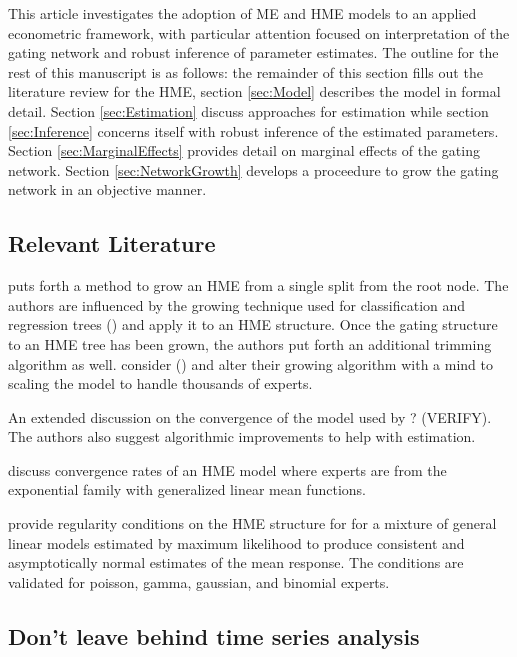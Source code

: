 \documentclass[12pt]{article}
\begin{document}
\bigskip

This article investigates the adoption of ME and HME models to an applied
econometric framework, with particular attention focused on interpretation of
the gating network and robust inference of parameter estimates. The outline for the
rest of this manuscript is as follows: the remainder of this section
fills out the literature review for the HME, section \ref{sec:Model} describes
the model in formal detail. Section \ref{sec:Estimation} discuss approaches
for estimation while section \ref{sec:Inference} concerns itself with robust
inference of the estimated parameters. Section \ref{sec:MarginalEffects}
provides detail on marginal effects of the gating network. Section
\ref{sec:NetworkGrowth} develops a proceedure to grow the gating network
in an objective manner. 


\subsection{Relevant Literature}

\cite{WaterhouseRobinson1995} puts forth a method to grow an HME from a 
single split from the root node. The authors are influenced by the growing
technique used for classification and regression trees (\cite{CART1984}) and
apply it to an HME structure. Once the gating structure to an HME tree has
been grown, the authors put forth an additional trimming algorithm as well.
\cite{FFW1997} consider (\cite{WaterhouseRobinson1995}) and alter their
growing algorithm with a mind to scaling the model to handle thousands of
experts.

\cite{JordanXuConverge1995} An extended discussion on the convergence of the
model used by \cite{JordanJacobs1993} ? (VERIFY). The authors also suggest
algorithmic improvements to help with estimation.

\cite{JiangTanner1999} discuss convergence rates of an HME model where experts
are from the exponential family with generalized linear mean functions.

\cite{JiangTanner2000} provide regularity conditions on the HME structure for
for a mixture of general linear models estimated by maximum likelihood to
produce consistent and asymptotically normal estimates of the mean response.
The conditions are validated for poisson, gamma, gaussian, and binomial experts.


\subsection{Don't leave behind time series analysis}
\end{document}
